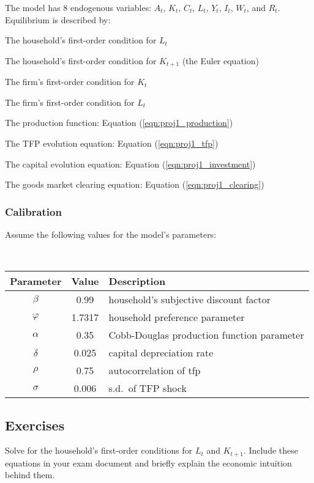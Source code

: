 The model has 8 endogenous variables: $A_t$, $K_t$, $C_t$, $L_t$, $Y_t$, $I_t$, $W_t$, and $R_t$. Equilibrium is described by:
	\EN
	\item The household's first-order condition for $L_t$
	\item The household's first-order condition for $K_{t+1}$ (the Euler equation)
	\item The firm's first-order condition for $K_t$
	\item The firm's first-order condition for $L_t$
	\item The production function: Equation (\ref{eqn:proj1_production})
	\item The TFP evolution equation: Equation (\ref{eqn:proj1_tfp})
	\item The capital evolution equation: Equation (\ref{eqn:proj1_investment})
	\item The goods  market clearing equation: Equation (\ref{eqn:proj1_clearing})
	\NE

\subsubsection{Calibration}

Assume the following values for the model's parameters:
	
	\
	
	\begin{center}
	\begin{tabular}{ccl}\textbf{Parameter} & \textbf{Value} & \textbf{Description}\\\hline
	$\beta$		& 0.99		& household's subjective discount factor\\
	$\varphi$	& 1.7317 	& household preference parameter\\
	$\alpha$	& 0.35		& Cobb-Douglas production function parameter\\
	$\delta$	& 0.025 	& capital depreciation rate\\
	$\rho$		& 0.75		& autocorrelation of tfp\\
	$\sigma$	& 0.006		& s.d.~of TFP shock\\\hline
	\end{tabular}
	\end{center}

\subsection{Exercises}

\EN
{} Solve for the household's first-order conditions for $L_t$ and $K_{t+1}$. Include these equations in your exam document and briefly explain the economic intuition behind them.

